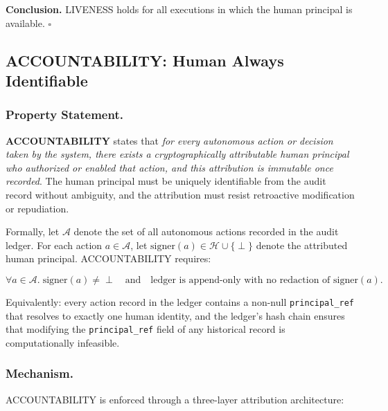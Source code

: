 \medskip
\noindent\textbf{Conclusion.} LIVENESS holds for all executions in which the human principal is available. $\square$

\bigskip

\subsection{ACCOUNTABILITY: Human Always Identifiable}
\label{subsection:accountability}

\subsubsection*{Property Statement.}
\textbf{ACCOUNTABILITY} states that \emph{for every autonomous action or decision taken by the system, there exists a cryptographically attributable human principal who authorized or enabled that action, and this attribution is immutable once recorded}. The human principal must be uniquely identifiable from the audit record without ambiguity, and the attribution must resist retroactive modification or repudiation.

Formally, let $\mathcal{A}$ denote the set of all autonomous actions recorded in the audit ledger. For each action $a \in \mathcal{A}$, let $\text{signer}(a) \in \mathcal{H} \cup \{\perp\}$ denote the attributed human principal. ACCOUNTABILITY requires:

\[
\forall a \in \mathcal{A}.\; \text{signer}(a) \neq \perp \quad \text{and} \quad \text{ledger is append-only with no redaction of } \text{signer}(a).
\]

Equivalently: every action record in the ledger contains a non-null \texttt{principal\_ref} that resolves to exactly one human identity, and the ledger's hash chain ensures that modifying the \texttt{principal\_ref} field of any historical record is computationally infeasible.

\subsubsection*{Mechanism.}
ACCOUNTABILITY is enforced through a three-layer attribution architecture:

